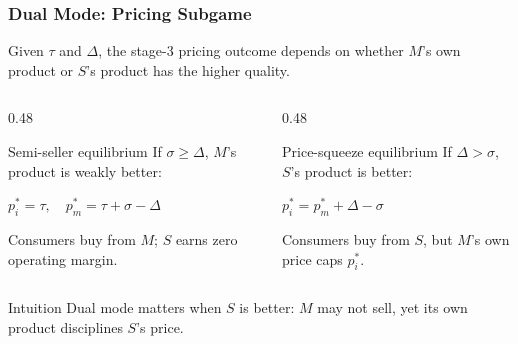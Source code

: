 \begin{frame}
  \frametitle{Dual Mode: Pricing Subgame}
  \footnotesize
  Given $\tau$ and $\Delta$, the stage-3 pricing outcome depends on whether
  $M$'s own product or $S$'s product has the higher quality.

  \begin{columns}[T,onlytextwidth]
    \begin{column}{0.48\textwidth}
      \begin{block}{Semi-seller equilibrium}
        If $\sigma\geq\Delta$, $M$'s product is weakly better:
        \begin{center}
          \hypertarget{dual_semiseller_src}{%
            \hyperlink{dual_semiseller_deriv}{%
              $\displaystyle p_i^*=\tau,\quad
              p_m^*=\tau+\sigma-\Delta$}}
        \end{center}
        Consumers buy from $M$; $S$ earns zero operating margin.
      \end{block}
    \end{column}

    \begin{column}{0.48\textwidth}
      \begin{block}{Price-squeeze equilibrium}
        If $\Delta>\sigma$, $S$'s product is better:
        \begin{center}
          \hypertarget{dual_squeeze_src}{%
            \hyperlink{dual_squeeze_deriv}{%
              $\displaystyle p_i^*=p_m^*+\Delta-\sigma$}}
        \end{center}
        Consumers buy from $S$, but $M$'s own price caps $p_i^*$.
      \end{block}
    \end{column}
  \end{columns}

  \begin{alertblock}{Intuition}
    Dual mode matters when $S$ is better: $M$ may not sell, yet its own product
    disciplines $S$'s price.
  \end{alertblock}
\end{frame}

